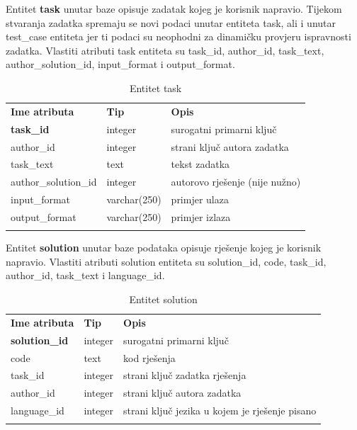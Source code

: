 \documentclass[times, utf8, zavrsni]{fer}
\begin{document}
		Entitet \textbf{task} unutar baze opisuje zadatak kojeg je korisnik napravio. Tijekom stvaranja zadatka spremaju se novi podaci unutar entiteta task, ali i unutar test\_case entiteta jer ti podaci su neophodni za dinamičku provjeru ispravnosti zadatka. Vlastiti atributi task entiteta su task\_id, author\_id, task\_text, author\_solution\_id, input\_format i output\_format.
		\begin{table}[H]
			\caption{Entitet task}
			\label{tbl:task}
			\centering
			\begin{tabu} to \textwidth {XXX}
				\tabucline[1.75pt]{-}
				\textbf{Ime atributa} & \textbf{Tip} & \textbf{Opis}\\ 				
				\tabucline[1.75pt]{-}
				\textbf{task\_id} & integer & surogatni primarni ključ\\ \hline
				author\_id & integer & strani ključ autora zadatka\\ \hline
				task\_text & text & tekst zadatka\\ \hline
				author\_solution\_id & integer & autorovo rješenje (nije nužno)\\ \hline
				input\_format & varchar(250) & primjer ulaza\\ \hline
				output\_format & varchar(250) & primjer izlaza\\ \hline
				\tabucline[1.75pt]{-}
			\end{tabu}
		\end{table}
	

		Entitet \textbf{solution} unutar baze podataka opisuje rješenje  kojeg je korisnik napravio. Vlastiti atributi solution entiteta su solution\_id, code, task\_id, author\_id, task\_text i language\_id.
		\begin{table}[H]
			\caption{Entitet solution}
			\label{tbl:solution}
			\centering
			\begin{tabu} to \textwidth {XXX}
				\tabucline[1.75pt]{-}
				\textbf{Ime atributa} & \textbf{Tip} & \textbf{Opis}\\ 				
				\tabucline[1.75pt]{-}
				\textbf{solution\_id} & integer & surogatni primarni ključ\\ \hline
				code & text & kod rješenja\\ \hline
				task\_id & integer & strani ključ zadatka rješenja\\ \hline
				author\_id & integer & strani ključ autora zadatka\\ \hline
				language\_id & integer & strani ključ jezika u kojem je rješenje pisano\\ \hline
				\tabucline[1.75pt]{-}
			\end{tabu}
		\end{table}
	
\end{document}
